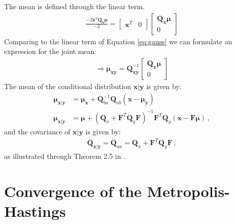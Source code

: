 The mean is defined through the linear term.
\begin{align}
    \frac{- 2 \bm{x}^T \bm{Q_x \mu } }{-2} = \begin{bmatrix}
        \bm{x}^T & 0
    \end{bmatrix} \begin{bmatrix}
        \bm{Q_x \mu}\\ 0
    \end{bmatrix} 
    \end{align} 
Comparing to the linear term of Equation \ref{eq:gauss} we can formulate an expression for the joint mean:
    \begin{align}
    \Rightarrow \bm{\mu_{xy}} = \bm{Q}_{\bm{x}\bm{y}}^{-1}   \begin{bmatrix}
        \bm{Q_x \mu}\\ 0
    \end{bmatrix}
\end{align}
The mean of the conditional distribution $\bm{x}|\bm{y}$ is given by:
\begin{align}
\bm{\mu}_{\bm{x}|\bm{y}} &= \bm{\mu}_{\bm{x}} + \bm{Q}^{-1}_{ba} \bm{Q}_{ab} (\bm{x} - \bm{\mu}_{\bm{y}}) \\
\bm{\mu}_{\bm{x}|\bm{y}} &= \bm{\mu} +  ( \bm{Q}_x + \bm{F}^T \bm{Q}_y \bm{F} )^{-1} \bm{F}^T \bm{Q}_y ( \bm{x} - \bm{F \mu} ) \, ,
\end{align}
and the covariance of $\bm{x}|\bm{y}$ is given by:
\begin{align}
   \bm{Q}_{\bm{x}|\bm{y}} =  \bm{Q}_{aa} = \bm{Q}_x + \bm{F}^T \bm{Q}_y \bm{F} \, ,
\end{align}
as illustrated through Theorem 2.5 in \cite{rue2005gaussian}.


\chapter{Convergence of the Metropolis-Hastings}
\label{ap:MetroHast}

